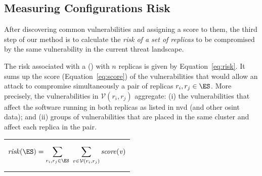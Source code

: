\subsection{Measuring Configurations Risk}
\label{sec:risk}

After discovering common vulnerabilities and assigning a score to them, the third step of our method is to calculate the \emph{risk of a set of replicas} to be compromised by the same vulnerability in the current threat landscape.


The risk associated with a \configuration (\ES) with $n$ replicas is given by Equation~\ref{eq:risk}. 
It sums up the score (Equation~\ref{eq:score}) of the vulnerabilities that would allow an attack to compromise simultaneously a pair of replicas $r_i,r_j \in \ES$.
More precisely, the vulnerabilities in $\mathcal{V}(r_i,r_j)$ aggregate: (i) the vulnerabilities that affect the software running in both replicas as listed in \gls{nvd} (and other \gls{osint} data); and (ii) groups of vulnerabilities that are placed in the same cluster and affect each replica in the pair. 

\begin{table}[h]
\begin{center}
\begin{tabular}{ c }

\vbox{
\begin{equation}
\mathit{risk(\ES)}=\sum_{r_i,r_j \in \ES}^{} \hspace{1.2mm} \sum_{v \in \mathcal{V}(r_i,r_j)}^{}\mathit{score(v)}
\label{eq:risk}
\end{equation}
}
\\
\end{tabular}
\end{center}
\end{table}


